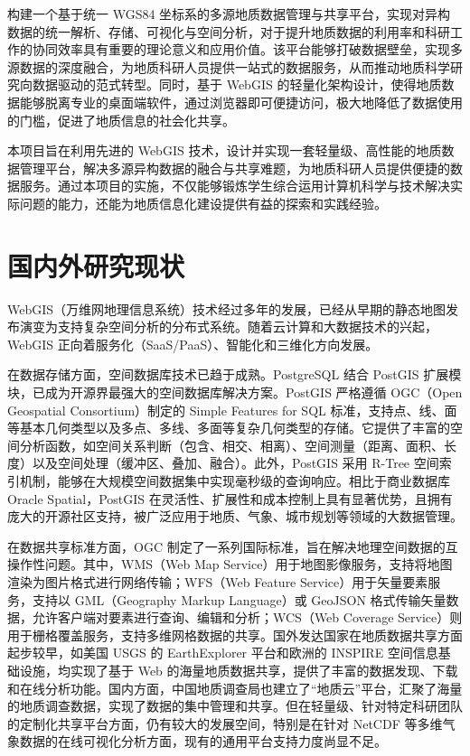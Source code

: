 \documentclass[a4paper,12pt]{ctexart}
\begin{document}
构建一个基于统一 WGS84 坐标系的多源地质数据管理与共享平台，实现对异构数据的统一解析、存储、可视化与空间分析，对于提升地质数据的利用率和科研工作的协同效率具有重要的理论意义和应用价值。该平台能够打破数据壁垒，实现多源数据的深度融合，为地质科研人员提供一站式的数据服务，从而推动地质科学研究向数据驱动的范式转型。同时，基于 WebGIS 的轻量化架构设计，使得地质数据能够脱离专业的桌面端软件，通过浏览器即可便捷访问，极大地降低了数据使用的门槛，促进了地质信息的社会化共享。

本项目旨在利用先进的 WebGIS 技术，设计并实现一套轻量级、高性能的地质数据管理平台，解决多源异构数据的融合与共享难题，为地质科研人员提供便捷的数据服务。通过本项目的实施，不仅能够锻炼学生综合运用计算机科学与技术解决实际问题的能力，还能为地质信息化建设提供有益的探索和实践经验。

\section{国内外研究现状}

WebGIS（万维网地理信息系统）技术经过多年的发展，已经从早期的静态地图发布演变为支持复杂空间分析的分布式系统。随着云计算和大数据技术的兴起，WebGIS 正向着服务化（SaaS/PaaS）、智能化和三维化方向发展。

在数据存储方面，空间数据库技术已趋于成熟。PostgreSQL 结合 PostGIS 扩展模块，已成为开源界最强大的空间数据库解决方案。PostGIS 严格遵循 OGC（Open Geospatial Consortium）制定的 Simple Features for SQL 标准，支持点、线、面等基本几何类型以及多点、多线、多面等复杂几何类型的存储。它提供了丰富的空间分析函数，如空间关系判断（包含、相交、相离）、空间测量（距离、面积、长度）以及空间处理（缓冲区、叠加、融合）。此外，PostGIS 采用 R-Tree 空间索引机制，能够在大规模空间数据集中实现毫秒级的查询响应。相比于商业数据库 Oracle Spatial，PostGIS 在灵活性、扩展性和成本控制上具有显著优势，且拥有庞大的开源社区支持，被广泛应用于地质、气象、城市规划等领域的大数据管理。

在数据共享标准方面，OGC 制定了一系列国际标准，旨在解决地理空间数据的互操作性问题。其中，WMS（Web Map Service）用于地图影像服务，支持将地图渲染为图片格式进行网络传输；WFS（Web Feature Service）用于矢量要素服务，支持以 GML（Geography Markup Language）或 GeoJSON 格式传输矢量数据，允许客户端对要素进行查询、编辑和分析；WCS（Web Coverage Service）则用于栅格覆盖服务，支持多维网格数据的共享。国外发达国家在地质数据共享方面起步较早，如美国 USGS 的 EarthExplorer 平台和欧洲的 INSPIRE 空间信息基础设施，均实现了基于 Web 的海量地质数据共享，提供了丰富的数据发现、下载和在线分析功能。国内方面，中国地质调查局也建立了“地质云”平台，汇聚了海量的地质调查数据，实现了数据的集中管理和共享。但在轻量级、针对特定科研团队的定制化共享平台方面，仍有较大的发展空间，特别是在针对 NetCDF 等多维气象数据的在线可视化分析方面，现有的通用平台支持力度尚显不足。
\end{document}
